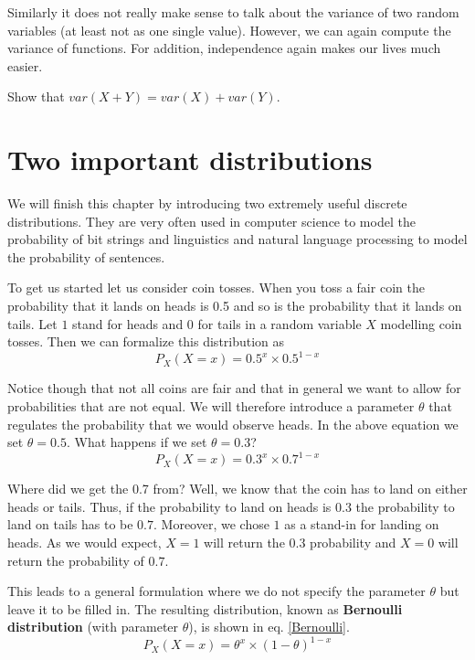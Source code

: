 \documentclass[a4paper,11pt,leqno]{report}
\begin{document}
Similarly it does not really make sense to talk about the variance of two random variables (at least not as one single
value). However, we can again compute the variance of functions. For addition, independence again makes our lives
much easier.

\begin{Exercise}
Show that $ var(X + Y) = var(X) + var(Y) $.
\end{Exercise}



\section{Two important distributions}

We will finish this chapter by introducing two extremely useful discrete distributions. They are very often used in
computer science to model the probability of bit strings and linguistics and natural language processing to model
the probability of sentences. 

To get us started let us consider coin tosses. When you toss a fair coin the probability that it lands on heads is 0.5 and
so is the probability that it lands on tails. Let $ 1 $ stand for heads and $ 0 $ for tails in a random variable $ X $ 
modelling coin tosses. Then we can formalize this distribution as
\begin{equation}
P_{X}(X=x) = 0.5^{x}\times 0.5^{1-x}
\end{equation}

Notice though that not all coins are fair and that in general we want to allow for probabilities that are not equal. 
We will therefore introduce a parameter $ \theta $ that regulates the probability that we would observe heads. In the
above equation we set $ \theta = 0.5 $. What happens if we set $ \theta = 0.3 $?
\begin{equation}
P_{X}(X=x) = 0.3^{x} \times 0.7^{1-x}
\end{equation}

Where did we get the 0.7 from? Well, we know that the coin has to land on either heads or tails. Thus, if the probability
to land on heads is $ 0.3 $ the probability to land on tails has to be $ 0.7 $. Moreover, we chose $ 1 $ as a stand-in for
landing on heads. As we would expect, $ X = 1 $ will return the $ 0.3 $ probability and $ X = 0 $ will return the probability of $ 0.7 $.

This leads to a general formulation where we do not specify the parameter $ \theta $ but leave it to be filled in. 
The resulting distribution, known as \textbf{Bernoulli distribution} (with parameter $ \theta $), is shown in eq. \ref{Bernoulli}.
\begin{equation}\label{Bernoulli}
P_{X}(X=x) = \theta^{x} \times (1 - \theta)^{1-x}
\end{equation}
\end{document}
